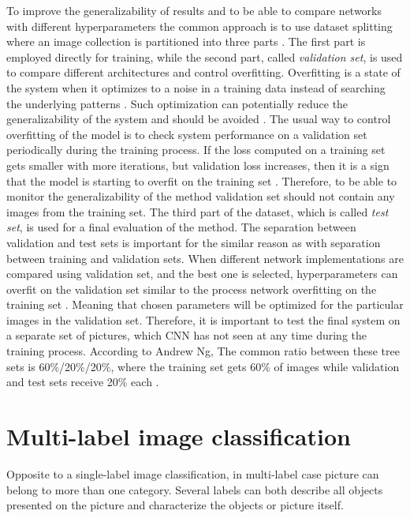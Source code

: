To improve the generalizability of results and to be able to compare networks with different hyperparameters the common approach is to use dataset splitting where an image collection is partitioned into three parts \cite{cs231n-cls}. The first part is employed directly for training, while the second part, called \textit{validation set}, is used to compare different architectures and control overfitting.  Overfitting is a state of the system when it optimizes to a noise in a training data instead of searching the underlying patterns \cite{cs231n-nn1}. Such optimization can potentially reduce the generalizability of the system and should be avoided \cite{cs231n-nn1}. The usual way to control overfitting of the model is to check system performance on a validation set periodically \cite{cs231n-nn3} during the training process. If the loss computed on a training set gets smaller with more iterations, but validation loss increases, then it is a sign that the model is starting to overfit on the training set \cite{cs231n-nn3}. Therefore, to be able to monitor the generalizability of the method validation set should not contain any images from the training set. The third part of the dataset, which is called \textit{test set}, is used for a final evaluation of the method. The separation between validation and test sets is important for the similar reason as with separation between training and validation sets. When different network implementations are compared using validation set, and the best one is selected, hyperparameters can overfit on the validation set similar to the process network overfitting on the training set \cite{cs231n-cls}. Meaning that chosen parameters will be optimized for the particular images in the validation set. Therefore, it is important to test the final system on a separate set of pictures, which CNN has not seen at any time during the training process. According to Andrew Ng, The common ratio between these tree sets is 60\%/20\%/20\%, where the training set gets 60\% of images while validation and test sets receive 20\% each \cite{Ng2016NutsLearning}.

\section{Multi-label image classification}
Opposite to a single-label image classification, in multi-label case picture can belong to more than one category. Several labels can both describe all objects presented on the picture and characterize the objects or picture itself.

